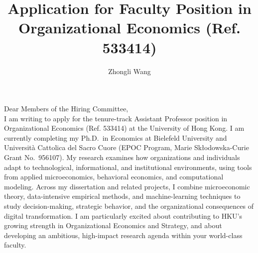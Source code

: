 \documentclass{nfr}
\title{Application for Faculty Position in Organizational Economics (Ref. 533414)}
\author{Zhongli Wang}
\begin{document}

% 
% 
% 
% 


\maketitle


\noindent Dear Members of the Hiring Committee,\\[0.2cm]

I am writing to apply for the tenure-track Assistant Professor position in Organizational Economics (Ref. 533414) at the University of Hong Kong. 
I am currently completing my Ph.D.\ in Economics at Bielefeld University and Università Cattolica del Sacro Cuore (EPOC Program, Marie Skłodowska-Curie Grant No.~956107). 
My research examines how organizations and individuals adapt to technological, informational, and institutional environments, using tools from applied microeconomics, behavioral economics, and computational modeling. 
Across my dissertation and related projects, I combine microeconomic theory, data-intensive empirical methods, and machine-learning techniques to study decision-making, strategic behavior, and the organizational consequences of digital transformation. 
I am particularly excited about contributing to HKU’s growing strength in Organizational Economics and Strategy, and about developing an ambitious, high-impact research agenda within your world-class faculty.\\
\end{document}
